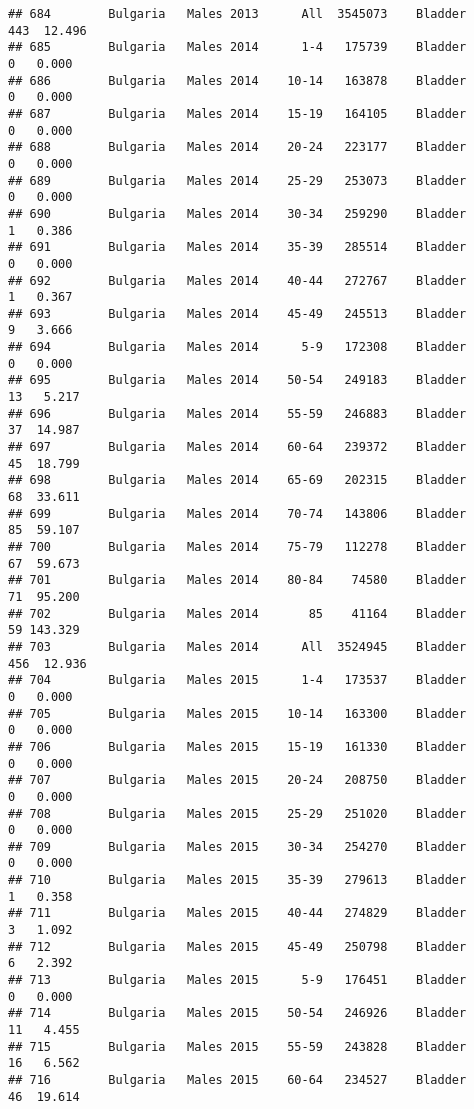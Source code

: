 \documentclass[
]{article}
\begin{document}
\begin{verbatim}
## 684        Bulgaria   Males 2013      All  3545073    Bladder    443  12.496
## 685        Bulgaria   Males 2014      1-4   175739    Bladder      0   0.000
## 686        Bulgaria   Males 2014    10-14   163878    Bladder      0   0.000
## 687        Bulgaria   Males 2014    15-19   164105    Bladder      0   0.000
## 688        Bulgaria   Males 2014    20-24   223177    Bladder      0   0.000
## 689        Bulgaria   Males 2014    25-29   253073    Bladder      0   0.000
## 690        Bulgaria   Males 2014    30-34   259290    Bladder      1   0.386
## 691        Bulgaria   Males 2014    35-39   285514    Bladder      0   0.000
## 692        Bulgaria   Males 2014    40-44   272767    Bladder      1   0.367
## 693        Bulgaria   Males 2014    45-49   245513    Bladder      9   3.666
## 694        Bulgaria   Males 2014      5-9   172308    Bladder      0   0.000
## 695        Bulgaria   Males 2014    50-54   249183    Bladder     13   5.217
## 696        Bulgaria   Males 2014    55-59   246883    Bladder     37  14.987
## 697        Bulgaria   Males 2014    60-64   239372    Bladder     45  18.799
## 698        Bulgaria   Males 2014    65-69   202315    Bladder     68  33.611
## 699        Bulgaria   Males 2014    70-74   143806    Bladder     85  59.107
## 700        Bulgaria   Males 2014    75-79   112278    Bladder     67  59.673
## 701        Bulgaria   Males 2014    80-84    74580    Bladder     71  95.200
## 702        Bulgaria   Males 2014       85    41164    Bladder     59 143.329
## 703        Bulgaria   Males 2014      All  3524945    Bladder    456  12.936
## 704        Bulgaria   Males 2015      1-4   173537    Bladder      0   0.000
## 705        Bulgaria   Males 2015    10-14   163300    Bladder      0   0.000
## 706        Bulgaria   Males 2015    15-19   161330    Bladder      0   0.000
## 707        Bulgaria   Males 2015    20-24   208750    Bladder      0   0.000
## 708        Bulgaria   Males 2015    25-29   251020    Bladder      0   0.000
## 709        Bulgaria   Males 2015    30-34   254270    Bladder      0   0.000
## 710        Bulgaria   Males 2015    35-39   279613    Bladder      1   0.358
## 711        Bulgaria   Males 2015    40-44   274829    Bladder      3   1.092
## 712        Bulgaria   Males 2015    45-49   250798    Bladder      6   2.392
## 713        Bulgaria   Males 2015      5-9   176451    Bladder      0   0.000
## 714        Bulgaria   Males 2015    50-54   246926    Bladder     11   4.455
## 715        Bulgaria   Males 2015    55-59   243828    Bladder     16   6.562
## 716        Bulgaria   Males 2015    60-64   234527    Bladder     46  19.614

\end{verbatim}
\end{document}
